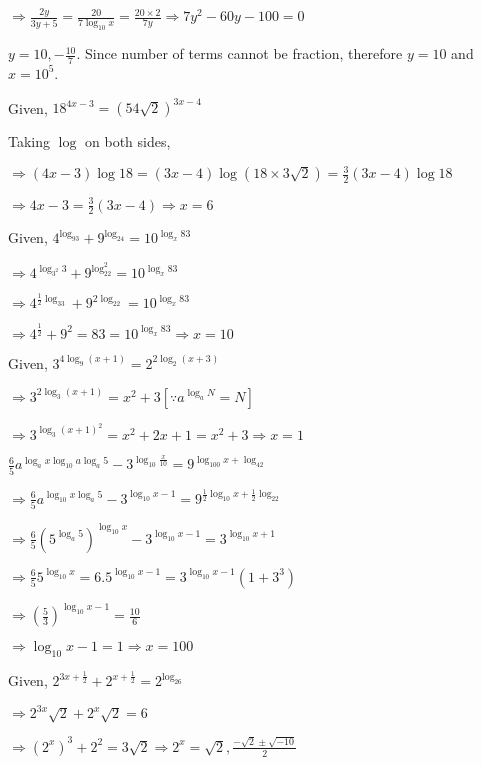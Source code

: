  $\Rightarrow \frac{2y}{3y + 5} = \frac{20}{7\log_{10}x} = \frac{20\times2}{7y} \Rightarrow 7y^2 - 60y - 100 = 0$

  $y = 10, -\frac{10}{7}$. Since number of terms cannot be fraction, therefore $y = 10$ and $x = 10^5$.
\item Given, $18^{4x - 3} = (54\sqrt{2})^{3x - 4}$

  Taking $\log$ on both sides,

  $\Rightarrow (4x - 3)\log18 = (3x - 4)\log(18\times3\sqrt{2}) = \frac{3}{2}(3x -4)\log18$

  $\Rightarrow 4x - 3 = \frac{3}{2}(3x - 4) \Rightarrow x = 6$
\item Given, $4^{\log_93} + 9^{\log_24} = 10^{\log_x83}$

  $\Rightarrow 4^{\log_{3^2}3} + 9^{\log_22^2} = 10^{\log_x83}$

  $\Rightarrow 4^{\tfrac{1}{2}\log_33} + 9^{2\log_22} = 10^{\log_x83}$

  $\Rightarrow 4^{\tfrac{1}{2}} + 9^2 = 83 = 10^{\log_x83}\Rightarrow x = 10$
\item Given, $3^{4\log_9(x + 1)} = 2^{2\log_2(x + 3)}$

  $\Rightarrow 3^{2\log_3(x + 1)} = x^2 + 3 [\because a^{\log_aN} = N]$

  $\Rightarrow 3^{\log_3(x + 1)^2} = x^2 + 2x + 1 = x^2 + 3 \Rightarrow x = 1$
\item $\frac{6}{5}a^{\log_ax\log_{10}a\log_a5} - 3^{\log_{10}\tfrac{x}{10}} = 9^{\log_{100}x + \log_42}$

  $\Rightarrow \frac{6}{5}a^{\log_{10}x\log_a5} - 3^{\log_{10}x - 1} = 9^{\tfrac{1}{2}\log_{10}x + \tfrac{1}{2}\log_22}$

  $\Rightarrow \frac{6}{5}\left(5^{\log_a5}\right)^{\log_{10}x} - 3^{\log_{10}x - 1} = 3^{\log_{10}x + 1}$

  $\Rightarrow \frac{6}{5}5^{\log_{10}x} = 6.5^{\log_{10}x - 1} = 3^{\log_{10}x - 1}(1 + 3^3)$

  $\Rightarrow \left(\frac{5}{3}\right)^{\log_{10}x - 1} = \frac{10}{6}$

  $\Rightarrow \log_{10}x - 1 = 1\Rightarrow x = 100$
\item Given, $2^{3x + \tfrac{1}{2}} + 2^{x + \tfrac{1}{2}} = 2^{\log_26}$

  $\Rightarrow 2^{3x}\sqrt{2} + 2^x\sqrt{2} = 6$

  $\Rightarrow (2^x)^3 + 2^2 = 3\sqrt{2} \Rightarrow 2^x = \sqrt{2}, \frac{-\sqrt{2} \pm \sqrt{-10}}{2}$

